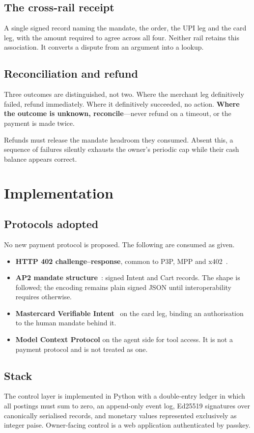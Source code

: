 \documentclass[journal,onecolumn,11pt]{IEEEtran}
\begin{document}
\subsection{The cross-rail receipt}
A single signed record naming the mandate, the order, the UPI leg and the card leg,
with the amount required to agree across all four. Neither rail retains this
association. It converts a dispute from an argument into a lookup.

\subsection{Reconciliation and refund}
Three outcomes are distinguished, not two. Where the merchant leg definitively failed,
refund immediately. Where it definitively succeeded, no action. \textbf{Where the
outcome is unknown, reconcile}---never refund on a timeout, or the payment is made
twice.

Refunds must release the mandate headroom they consumed. Absent this, a sequence of
failures silently exhausts the owner's periodic cap while their cash balance appears
correct.

\section{Implementation}\label{sec:stack}

\subsection{Protocols adopted}
No new payment protocol is proposed. The following are consumed as given.

\begin{itemize}[leftmargin=*]
\item \textbf{HTTP 402 challenge--response}, common to P3P, MPP and x402~\cite{p3p,mpp,x402}.
\item \textbf{AP2 mandate structure}~\cite{ap2}: signed Intent and Cart records. The
shape is followed; the encoding remains plain signed JSON until interoperability
requires otherwise.
\item \textbf{Mastercard Verifiable Intent}~\cite{mc-vi} on the card leg, binding an
authorisation to the human mandate behind it.
\item \textbf{Model Context Protocol} on the agent side for tool access. It is not a
payment protocol and is not treated as one.
\end{itemize}

\subsection{Stack}
The control layer is implemented in Python with a double-entry ledger in which all
postings must sum to zero, an append-only event log, Ed25519 signatures over
canonically serialised records, and monetary values represented exclusively as integer
paise. Owner-facing control is a web application authenticated by passkey.
\end{document}
